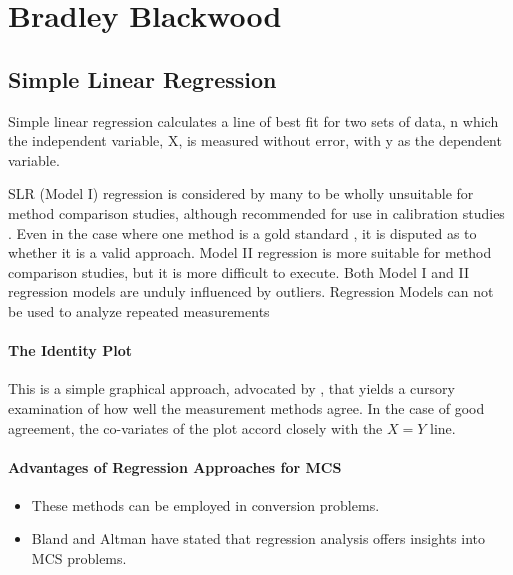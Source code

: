 \documentclass[MAIN.tex]{subfiles}
\begin{document}
	\chapter{Bradley Blackwood}
\section{Simple Linear Regression}





Simple linear regression calculates a line of best fit for two
sets of data, n which the independent variable, X, is measured without error, with y as the dependent variable.  

SLR (Model I) regression is considered by many \citet{BA83,CornCoch,ludbrook97} to be wholly unsuitable for
method comparison studies, although recommended for use in calibration studies \citep{CornCoch}. Even in the case where one
method is a gold standard , it is disputed as to whether it is a valid approach. Model II regression is more suitable for method comparison studies, but it is more difficult to execute. Both Model I and II regression models are unduly influenced by outliers. Regression Models can not be used to analyze repeated measurements




\subsubsection{The Identity Plot} This is a simple graphical approach, advocated by \citet{BA86}, that yields a cursory examination of how well the measurement methods agree. In the case of good agreement, the co-variates of the plot accord closely with the $X=Y$ line.

\subsubsection{Advantages of Regression Approaches for MCS}
\begin{itemize}
	\item These methods can be employed in conversion problems.
	\item Bland and Altman have stated that regression analysis offers insights into MCS problems.
\end{itemize}
\end{document}
